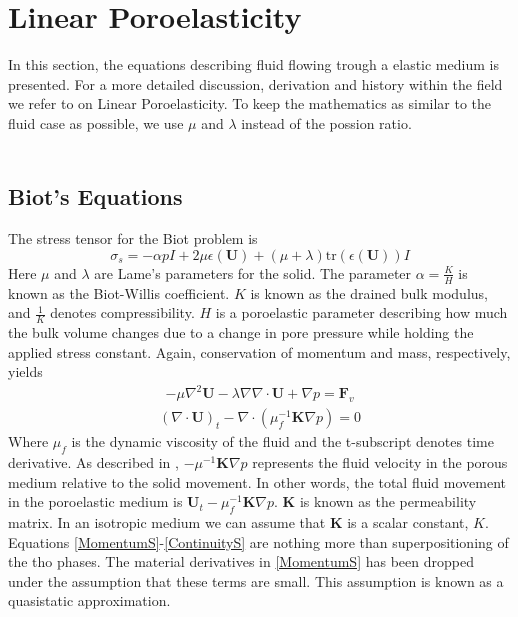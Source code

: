 \section{Linear Poroelasticity}
In this section, the equations describing fluid flowing trough a elastic medium is presented. For a more detailed discussion, derivation and history within the field we refer to \cite{Wang00} on Linear Poroelasticity. To keep the mathematics as similar to the fluid case as possible, we use $\mu$ and $\lambda$ instead of the possion ratio. 
\\
\\

\subsection{Biot's Equations}
The stress tensor for the Biot problem is 
\[ \sigma_s = -\alpha pI + 2\mu \epsilon(\mathbf{U}) + (\mu + \lambda)\text{tr}(\epsilon(\mathbf{U}))I  \]
Here $\mu$ and $\lambda$ are Lame's parameters for the solid. The parameter $\alpha = \frac{K}{H}$ is known as the Biot-Willis coefficient. $K$ is known as the drained bulk modulus, and $\frac{1}{K}$ denotes compressibility. $H$ is a poroelastic parameter describing how much the bulk volume changes due to a change in pore pressure while holding the applied stress constant. Again, conservation of momentum and mass, respectively, yields
\begin{align}
	 - \mu \nabla ^2 \mathbf{U}
	 - \lambda \nabla \nabla \cdot \mathbf{U}
	 + \nabla p = \mathbf{F}_v \label{MomentumS}
\end{align}
\begin{align}
	 (\nabla \cdot \mathbf{U})_t
	 - \nabla \cdot (\mu_f^{-1} \mathbf{K} \nabla p) 
	 = 0 \label{ContinuityS}
\end{align}
Where $\mu_f$ is the dynamic viscosity of the fluid and the t-subscript denotes time derivative. As described in \cite{Niel13}, $-\mu^{-1}\mathbf{K} \nabla p$ represents the fluid velocity in the porous medium relative to the solid movement. In other words, the total fluid movement in the poroelastic medium is $\mathbf{U}_t - \mu_f^{-1}\mathbf{K} \nabla p$. $\mathbf{K}$ is known as the permeability matrix. In an isotropic medium we can assume that $\mathbf{K}$ is a scalar constant, $K$.
\\
Equations \eqref{MomentumS}-\eqref{ContinuityS} are nothing more than superpositioning of the tho phases. The material derivatives in \eqref{MomentumS} has been dropped under the assumption that these terms are small. This assumption is known as a quasistatic approximation. 
\\

